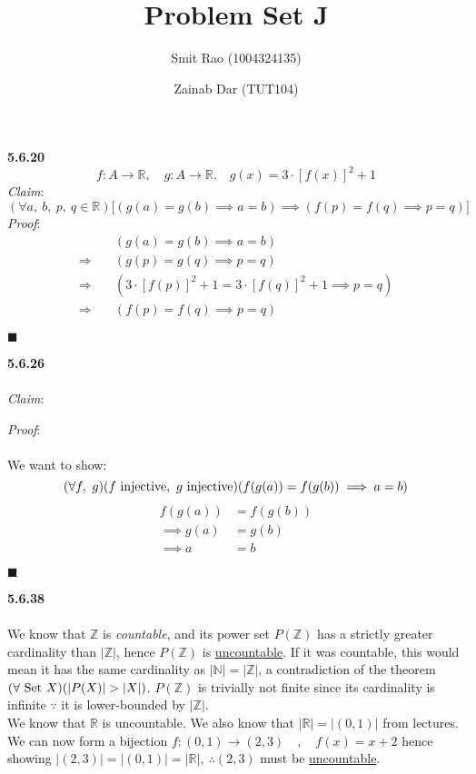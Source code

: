 \documentclass[12pt]{article}
\title{Problem Set J}
\author{Smit Rao (1004324135) \and Zainab Dar (TUT104)}
\begin{document}
\maketitle
\parindent=0pt
\textbf{5.6.20}
$$f:A \to \mathbb{R}, \quad g:A \to \mathbb{R}. \quad g(x) = 3\cdot [f(x)]^2+1$$
\emph{Claim}: 
$$(\forall a,\ b,\ p,\ q \in \mathbb{R})\big[(g(a)=g(b) \implies a=b) \implies (f(p)=f(q) \implies p=q)\big]$$
\emph{Proof}:
\begin{align*}
&(g(a)=g(b) \implies a=b)\\
\Rightarrow \quad& (g(p)=g(q) \implies p=q)\\
\Rightarrow \quad& (3\cdot [f(p)]^2+1=3\cdot [f(q)]^2+1 \implies p=q)\\
\Rightarrow \quad& (f(p)=f(q) \implies p=q)
\end{align*}
\begin{flushright}
$\blacksquare$
\end{flushright}
\textbf{5.6.26}\\\\
\emph{Claim}:
\begin{center}
\end{center}
\emph{Proof}:\\\\
We want to show:
$$(\forall f,\ g)(f\ \textnormal{injective},\ g\ \textnormal{injective})(f(g(a))=f(g(b))\implies a=b)$$
\begin{align*}
f(g(a)) &=f(g(b))\\
\implies g(a) &=g(b)\\
\implies a &=b
\end{align*}
\begin{flushright}
$\blacksquare$
\end{flushright}
\pagebreak
\textbf{5.6.38}\\\\
We know that $\mathbb{Z}$ is \emph{countable}, and its power set $P(\mathbb{Z})$ has a strictly greater cardinality than $|\mathbb{Z}|$, hence $P(\mathbb{Z})$ is \underline{uncountable}. If it was countable, this would mean it has the same cardinality as $|\mathbb{N}|=|\mathbb{Z}|$, a contradiction of the theorem $(\forall\ \textnormal{Set}\ X)(|P(X)|>|X|)$. $P(\mathbb{Z})$ is trivially not finite since its cardinality is infinite $\because$ it is lower-bounded by $|\mathbb{Z}|$.\\

We know that $\mathbb{R}$ is uncountable. We also know that $|\mathbb{R}|=|(0, 1)|$ from lectures. We can now form a bijection $f:(0, 1) \to (2,3) \quad, \quad f(x)=x+2$ hence showing $|(2, 3)|=|(0, 1)|=|\mathbb{R}|,\ \therefore (2, 3)$ must be \underline{uncountable}.\\
\end{document}

